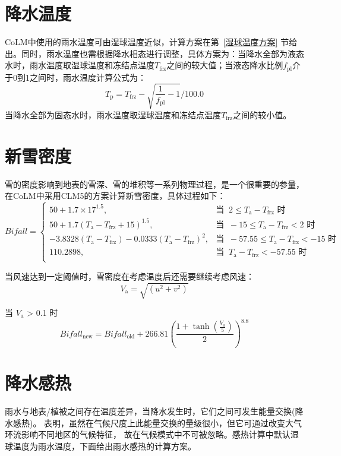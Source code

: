 \section{降水温度}
CoLM中使用的雨水温度可由湿球温度近似，计算方案在第~\ref{湿球温度方案} 节给出。同时，雨水温度也需根据降水相态进行调整，具体方案为：当降水全部为液态水时，雨水温度取湿球温度和冻结点温度$T_{\mathrm{frz}}$之间的较大值；当液态降水比例$f_{\mathrm{pl}}$介于0到1之间时，雨水温度计算公式为：$$T_{\mathrm {p}}=T_{\mathrm{frz}}-\sqrt{\frac{1}{f_{\mathrm{pl}}}-1}/100.0$$
当降水全部为固态水时，雨水温度取湿球温度和冻结点温度$T_{\mathrm{frz}}$之间的较小值。


\section{新雪密度}
雪的密度影响到地表的雪深、雪的堆积等一系列物理过程，是一个很重要的参量，在CoLM中采用CLM5的方案计算新雪密度，具体过程如下：
\begin{equation*}
  Bifall= \begin{cases}
    50 + 1.7\times 17^{1.5}, & \text{当 }\ 2\leqslant T_{\mathrm {a}} - T_{\mathrm{frz}} \text{ 时}\\
    50 + 1.7(T_{\mathrm {a}} - T_{\mathrm{frz}}+15)^{1.5}, & \text{当 }\ -15\leqslant T_{\mathrm {a}} - T_{\mathrm{frz}} < 2 \text{ 时} \\
    -3.8328(T_{\mathrm {a}} - T_{\mathrm{frz}}) - 0.0333(T_{\mathrm {a}} - T_{\mathrm{frz}})^2, & \text{当 }\ -57.55\leqslant T_{\mathrm {a}} - T_{\mathrm{frz}} < -15 \text{ 时} \\
    110.2898, & \text{当 }\ T_{\mathrm {a}} - T_{\mathrm{frz}} < -57.55 \text{ 时}\\
  \end{cases}
\end{equation*}

当风速达到一定阈值时，雪密度在考虑温度后还需要继续考虑风速：
\begin{equation}
  V_{\mathrm {a}} = \sqrt{(u^2 + v^2)}
\end{equation}

当 $V_{\mathrm {a}}$ > 0.1 时
\begin{equation}
  Bifall_{\mathrm{new}} = Bifall_{\mathrm{old}} + 266.81{\left(\frac{1 + \tanh (\frac{V_{\mathrm {a}}}{5})}{2}\right)}^{8.8}
\end{equation}


\section{降水感热}\label{植被地表的雨水感热}
雨水与地表/植被之间存在温度差异，当降水发生时，它们之间可发生能量交换(降水感热)。
\citet{wei2014impact} 表明，虽然在气候尺度上此能量交换的量级很小，但它可通过改变大气环流影响不同地区的气候特征，
故在气候模式中不可被忽略。感热计算中默认湿球温度为雨水温度，下面给出雨水感热的计算方案。

